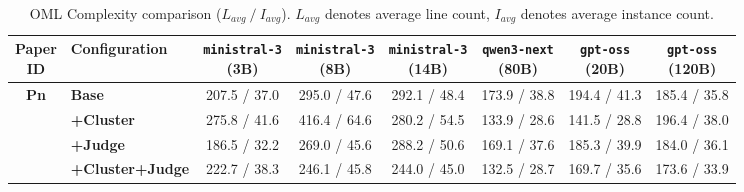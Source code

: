 \begin{table}[htbp]
    \centering
    \small
    \setlength{\tabcolsep}{4pt}
    \caption{OML Complexity comparison ($L_{avg}~/~I_{avg}$). $L_{avg}$ denotes average line count, $I_{avg}$ denotes average instance count.}
    \begin{tabular}{c|l|cccccc}
        \hline
        \makecell{\textbf{Paper} \\ \textbf{ID}} & \textbf{Configuration} & \makecell{\texttt{ministral-3} \\ (3B)} & \makecell{\texttt{ministral-3} \\ (8B)} & \makecell{\texttt{ministral-3} \\ (14B)} & \makecell{\texttt{qwen3-next} \\ (80B)} & \makecell{\texttt{gpt-oss} \\ (20B)} & \makecell{\texttt{gpt-oss} \\ (120B)} \\
        \hline
        
        \multirow{4}{*}{\textbf{Pn}} 
          & \textbf{Base} & 207.5 / 37.0 & 295.0 / 47.6 & 292.1 / 48.4 & 173.9 / 38.8 & 194.4 / 41.3 & 185.4 / 35.8\\
          & \textbf{+Cluster} & 275.8 / 41.6 & 416.4 / 64.6 & 280.2 / 54.5 & 133.9 / 28.6 & 141.5 / 28.8 & 196.4 / 38.0\\
          & \textbf{+Judge} & 186.5 / 32.2 & 269.0 / 45.6 & 288.2 / 50.6 & 169.1 / 37.6 & 185.3 / 39.9 & 184.0 / 36.1\\
          & \textbf{+Cluster+Judge} & 222.7 / 38.3 & 246.1 / 45.8 & 244.0 / 45.0 & 132.5 / 28.7 & 169.7 / 35.6 & 173.6 / 33.9\\
        \hline
        
    \end{tabular}
    \label{tab:complexity_pn}
\end{table}